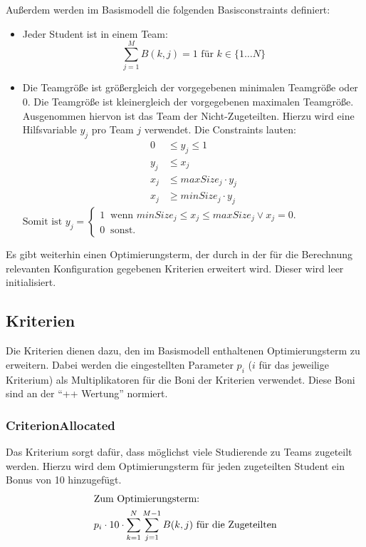 \documentclass[parskip=full]{scrartcl}
\begin{document}
Außerdem werden im Basismodell die folgenden Basisconstraints definiert:



 \begin{itemize}
   \item Jeder Student ist in einem Team: \begin{equation*}
   \sum_{j = 1}^{M} B(k,j) = 1 \text{ für } k \in \{ 1\ldots N \}
   \end{equation*}
   \item Die Teamgröße ist größergleich der vorgegebenen minimalen Teamgröße
   oder 0. Die Teamgröße ist kleinergleich der vorgegebenen maximalen Teamgröße.
   Ausgenommen hiervon ist das Team der Nicht-Zugeteilten. Hierzu wird eine
   Hilfsvariable $y_j$ pro Team $j$ verwendet. Die Constraints lauten:
   \begin{align*}
    0 &\le  y_j \le 1\\
     y_j &\le x_j\\ 
    x_j &\le maxSize_j \cdot y_j \\ 
    x_j &\ge minSize_j \cdot y_j 
    \end{align*}
    $\text{Somit ist } y_j = \begin{cases}
    1 \;\; \text{wenn $minSize_j \le x_j \le maxSize_j \vee x_j = 0$.} \\
    0 \;\; \text{sonst.} 
    \end{cases}$
 \end{itemize}
 
 Es gibt weiterhin einen Optimierungsterm, der durch in der für die Berechnung
 relevanten Konfiguration gegebenen Kriterien erweitert wird. Dieser wird leer
 initialisiert.


\subsection{Kriterien}
Die Kriterien dienen dazu, den im Basismodell enthaltenen Optimierungsterm zu
erweitern. Dabei werden die eingestellten Parameter $p_i$ ($i$ für das
jeweilige Kriterium) als Multiplikatoren für die Boni der Kriterien verwendet.
Diese Boni sind an der \enquote{++ Wertung} normiert. 

\subsubsection{CriterionAllocated}
Das Kriterium sorgt dafür, dass möglichst viele Studierende zu Teams zugeteilt
werden. Hierzu wird dem Optimierungsterm für jeden zugeteilten Student ein Bonus
von 10 hinzugefügt. \begin{align*}
\intertext{Zum Optimierungsterm:}
p_i \cdot 10 \cdot \sum_{k = 1}^{N} \sum_{j = 1}^{M-1} B(k,j) \text{ für die
Zugeteilten}
\end{align*}
\end{document}
